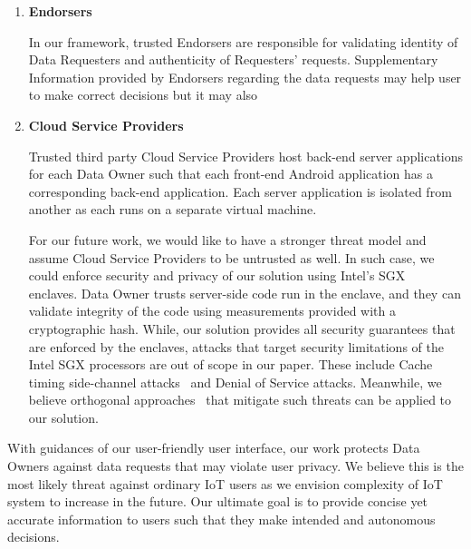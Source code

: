 \begin{enumerate}
\item \textbf {Endorsers}

In our framework, trusted Endorsers are responsible for validating identity of Data Requesters and authenticity of Requesters' requests. Supplementary Information provided by Endorsers regarding the data requests may help user to make correct decisions but it may also 

\item \textbf {Cloud Service Providers}

Trusted third party Cloud Service Providers host back-end server applications for each Data Owner such that each front-end Android application has a corresponding back-end application. Each server application is isolated from another as each runs on a separate virtual machine. 

For our future work, we would like to have a stronger threat model and assume Cloud Service Providers to be untrusted as well. In such case, we could enforce security and privacy of our solution using Intel's SGX~\cite{enclave} enclaves. Data Owner trusts server-side code run in the enclave, and they can validate integrity of the code using measurements provided with a cryptographic hash. While, our solution provides all security guarantees that are enforced by the enclaves, attacks that target security limitations of the Intel SGX processors are out of scope in our paper. These include Cache timing side-channel attacks~\cite{leaky} and Denial of Service attacks. Meanwhile, we believe orthogonal approaches~\cite{mengjia,raccoon} that mitigate such threats can be applied to our solution. 
\end{enumerate}

With guidances of our user-friendly user interface, our work protects Data Owners against data requests that may violate user privacy. We believe this is the most likely threat against ordinary IoT users as we envision complexity of IoT system to increase in the future. Our ultimate goal is to provide concise yet accurate information to users such that they make intended and autonomous decisions.